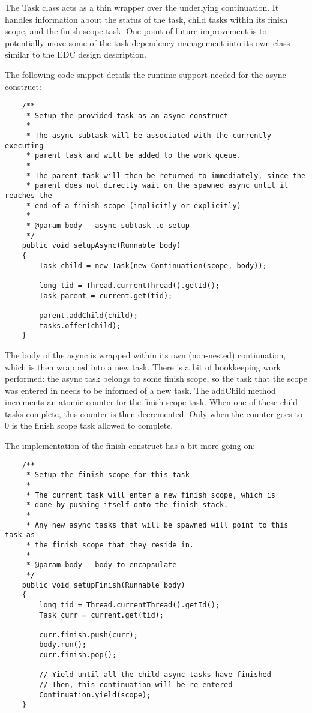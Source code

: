 \documentclass[12pt]{article}
\begin{document}
    The Task class acts as a thin wrapper over the underlying continuation. It handles information about the
    status of the task, child tasks within its finish scope, and the finish scope task. One point of future
    improvement is to potentially move some of the task dependency management into its own class -- similar
    to the EDC design description.

    The following code snippet details the runtime support needed for the async construct:

    \begin{lstlisting}
    /**
     * Setup the provided task as an async construct
     *
     * The async subtask will be associated with the currently executing
     * parent task and will be added to the work queue.
     *
     * The parent task will then be returned to immediately, since the
     * parent does not directly wait on the spawned async until it reaches the
     * end of a finish scope (implicitly or explicitly)
     *
     * @param body - async subtask to setup
     */
    public void setupAsync(Runnable body)
    {
        Task child = new Task(new Continuation(scope, body));

        long tid = Thread.currentThread().getId();
        Task parent = current.get(tid);

        parent.addChild(child);
        tasks.offer(child);
    }
    \end{lstlisting}

    The body of the async is wrapped within its own (non-nested) continuation, which is then wrapped into
    a new task. There is a bit of bookkeeping work performed: the async task belongs to some finish scope,
    so the task that the scope was entered in needs to be informed of a new task. The addChild method
    increments an atomic counter for the finish scope task. When one of these child tasks complete, this
    counter is then decremented. Only when the counter goes to 0 is the finish scope task allowed to
    complete.

    The implementation of the finish construct has a bit more going on:

    \begin{lstlisting}
    /**
     * Setup the finish scope for this task
     *
     * The current task will enter a new finish scope, which is
     * done by pushing itself onto the finish stack.
     *
     * Any new async tasks that will be spawned will point to this task as
     * the finish scope that they reside in.
     *
     * @param body - body to encapsulate
     */
    public void setupFinish(Runnable body)
    {
        long tid = Thread.currentThread().getId();
        Task curr = current.get(tid);

        curr.finish.push(curr);
        body.run();
        curr.finish.pop();

        // Yield until all the child async tasks have finished
        // Then, this continuation will be re-entered
        Continuation.yield(scope);
    }
    \end{lstlisting}
\end{document}
